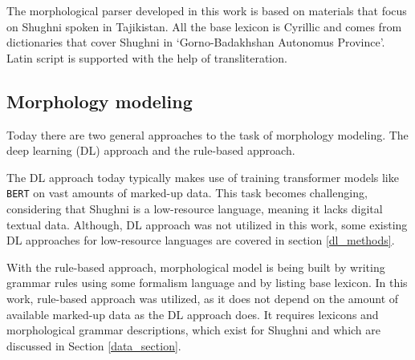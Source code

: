 The morphological parser developed in this work is based on materials that focus on Shughni spoken in Tajikistan. All the base lexicon is Cyrillic and comes from dictionaries that cover Shughni in `Gorno-Badakhshan Autonomus Province'. Latin script is supported with the help of transliteration.

\subsection{Morphology modeling}
Today there are two general approaches to the task of morphology modeling. The deep learning (DL) approach and the rule-based approach. 

The DL approach today typically makes use of training transformer models like \texttt{BERT} \parencite{devlin_2019} on vast amounts of marked-up data. This task becomes challenging, considering that Shughni is a low-resource language, meaning it lacks digital textual data. Although, DL approach was not utilized in this work, some existing DL approaches for low-resource languages are covered in section \ref{dl_methods}.

With the rule-based approach, morphological model is being built by writing grammar rules using some formalism language and by listing base lexicon. In this work, rule-based approach was utilized, as it does not depend on the amount of available marked-up data as the DL approach does. It requires lexicons and morphological grammar descriptions, which exist for Shughni and which are discussed in Section \ref{data_section}.